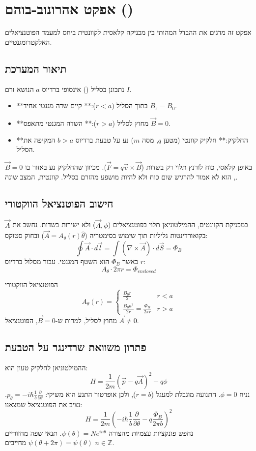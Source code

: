 \section{אפקט אהרונוב-בוהם ()}

אפקט זה מדגים את ההבדל המהותי בין מכניקה קלאסית לקוונטית ביחס למעמד הפוטנציאלים האלקטרומגנטיים.

\subsection{תיאור המערכת}
נתבונן בסליל () אינסופי ברדיוס $a$ הנושא זרם $I$.
\begin{itemize}
    \item **בתוך הסליל ($r < a$):** קיים שדה מגנטי אחיד $B_z = B_0$.
    \item **מחוץ לסליל ($r > a$):** השדה המגנטי מתאפס $\vec{B} = 0$.
    \item **החלקיק:** חלקיק קוונטי (מטען $q$, מסה $m$) נע על טבעת ברדיוס $b > a$ המקיפה את הסליל.
\end{itemize}

באופן קלאסי, כוח לורנץ תלוי רק בשדות ($\vec{F} = q\vec{v} \times \vec{B}$). מכיוון שהחלקיק נע באזור בו $\vec{B}=0$, הוא לא אמור להרגיש שום כוח ולא להיות מושפע מהזרם בסליל. קוונטית, המצב שונה.

\subsection{חישוב הפוטנציאל הווקטורי}
במכניקת הקוונטים, ההמילטוניאן תלוי בפוטנציאלים ($\vec{A}, \phi$) ולא ישירות בשדות. נחשב את $\vec{A}$ בקואורדינטות גליליות תוך שימוש בסימטריה ($\vec{A} = A_\theta(r)\hat{\theta}$) ובחוק סטוקס:
\[
\oint \vec{A} \cdot d\vec{l} = \int (\nabla \times \vec{A}) \cdot d\vec{S} = \Phi_B
\]
כאשר $\Phi_B$ הוא השטף המגנטי. עבור מסלול ברדיוס $r$:
\[
A_\theta \cdot 2\pi r = \Phi_{enclosed}
\]

\begin{resultbox}{הפוטנציאל הווקטורי}
\begin{equation}
A_\theta(r) = \begin{cases} 
\frac{B_0 r}{2} & r < a \\
\frac{B_0 a^2}{2r} = \frac{\Phi_B}{2\pi r} & r > a 
\end{cases}
\end{equation}
מחוץ לסליל, למרות ש-$\vec{B}=0$, הפוטנציאל $\vec{A} \neq 0$.
\end{resultbox}

\subsection{פתרון משוואת שרדינגר על הטבעת}
ההמילטוניאן לחלקיק טעון הוא:
\[
H = \frac{1}{2m}(\vec{p} - q\vec{A})^2 + q\phi
\]
נניח $\phi=0$. התנועה מוגבלת למעגל ($r=b$), ולכן אופרטור התנע הוא משיקי: $p_\theta = -i\hbar \frac{1}{b}\frac{\partial}{\partial \theta}$.
נציב את הפוטנציאל שמצאנו:
\[
H = \frac{1}{2m} \left( -i\hbar \frac{1}{b}\frac{\partial}{\partial \theta} - q \frac{\Phi_B}{2\pi b} \right)^2
\]
נחפש פונקציות עצמיות מהצורה $\psi(\theta) = N e^{in\theta}$. תנאי שפה מחזוריים $\psi(\theta + 2\pi) = \psi(\theta)$ מחייבים $n \in \mathbb{Z}$.

